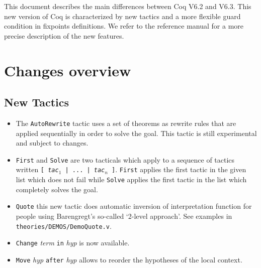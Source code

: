 \documentclass[11pt]{article}
\begin{document}

This document describes the main differences between Coq V6.2 and
V6.3.  This new version of Coq is characterized by new tactics and a
more flexible guard condition in fixpoints definitions.  
We refer to the reference manual
for a more precise description of the new features.



\section{Changes overview}

\subsection{New Tactics}

  \begin{itemize}

  \item The \texttt{AutoRewrite} tactic uses  a set of theorems
   as rewrite rules that are applied sequentially in order to
   solve the goal. This tactic is still experimental and subject to changes.

  \item \texttt{First} and \texttt{Solve} are two tacticals which
    apply to a sequence of
    tactics written \texttt{[ \textit{tac}$_1$ | ... |
      \textit{tac}$_n$ ]}.
   \texttt{First} applies the first tactic in the given list 
   which does not fail while
   \texttt{Solve} applies the first tactic in the list 
   which completely solves the goal.

  \item \texttt{Quote} this new tactic does automatic inversion of
  interpretation function for people using Barengregt's so-called
  `2-level approach'.  See examples in \texttt{theories/DEMOS/DemoQuote.v}.

  \item \texttt{Change} \textit{term} \texttt{in} \textit{hyp} is now
    available.

  \item \texttt{Move} \textit{hyp} \texttt{after} \textit{hyp} allows
  to reorder the hypotheses of the local context.

 \end{itemize}
\end{document}
